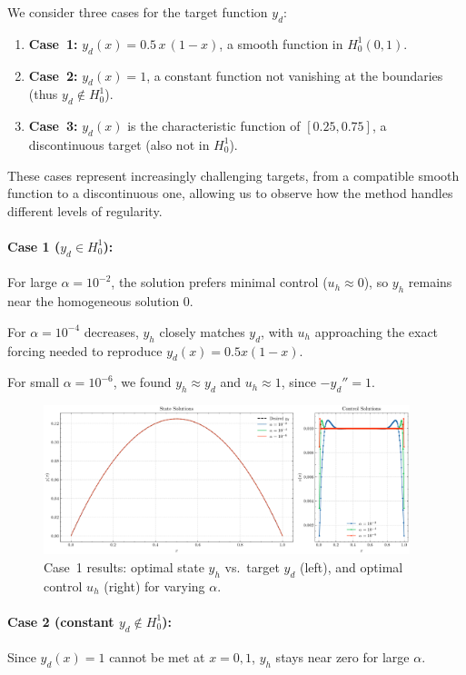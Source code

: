 \documentclass[a4paper,10pt]{article}
\begin{document}
We consider three cases for the target function $y_d$:
\begin{enumerate}
	\item \textbf{Case~1:} $y_d(x) = 0.5\,x\,(1-x)$, a smooth function in $H^1_0(0,1)$.
	\item \textbf{Case~2:} $y_d(x) = 1$, a constant function not vanishing at the boundaries (thus $y_d\notin H^1_0$).
	\item \textbf{Case~3:} $y_d(x)$ is the characteristic function of $[0.25,0.75]$, a discontinuous target (also not in $H^1_0$).
\end{enumerate}
These cases represent increasingly challenging targets, from a compatible smooth function to a discontinuous one, allowing us to observe how the method handles different levels of regularity.
\paragraph{Case 1 ($y_d \in H^1_0$):}
For large $\alpha = 10^{-2}$, the solution prefers minimal control ($u_h \approx 0$), so $y_h$ remains near the homogeneous solution $0$.

For $\alpha=10^{-4}$ decreases, $y_h$ closely matches $y_d$, with $u_h$ approaching the exact forcing needed to reproduce $y_d(x) = 0.5x(1-x)$.

For small $\alpha=10^{-6}$, we found $y_h \approx y_d$ and $u_h \approx 1$, since $-y_d''=1$.

\begin{figure}[htbp]
    \centering
    \includegraphics[width=0.95\textwidth]{figures/ocp_case1.png}
    \caption{Case~1 results: optimal state $y_h$ vs.\ target $y_d$ (left), and optimal control $u_h$ (right) for varying $\alpha$.}
    \label{fig:opt_control_case1_short}
\end{figure}

\paragraph{Case 2 (constant $y_d \notin H^1_0$):}
Since $y_d(x)=1$ cannot be met at $x=0,1$, $y_h$ stays near zero for large $\alpha$.
\end{document}
